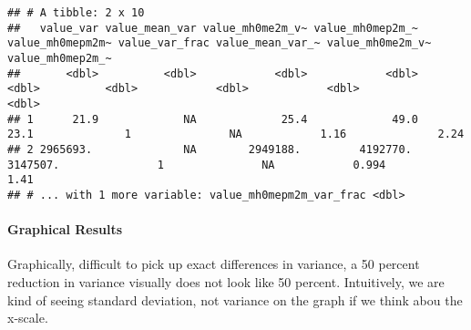 \documentclass[
]{book}
\newenvironment{Shaded}{\begin{snugshade}}{\end{snugshade}}
\newcommand{\DataTypeTok}[1]{\textcolor[rgb]{0.13,0.29,0.53}{#1}}
\newcommand{\DecValTok}[1]{\textcolor[rgb]{0.00,0.00,0.81}{#1}}
\newcommand{\KeywordTok}[1]{\textcolor[rgb]{0.13,0.29,0.53}{\textbf{#1}}}
\newcommand{\NormalTok}[1]{#1}
\newcommand{\OperatorTok}[1]{\textcolor[rgb]{0.81,0.36,0.00}{\textbf{#1}}}
\newcommand{\StringTok}[1]{\textcolor[rgb]{0.31,0.60,0.02}{#1}}
\begin{document}
\begin{Shaded}
\end{Shaded}

\begin{verbatim}
## # A tibble: 2 x 10
##   value_var value_mean_var value_mh0me2m_v~ value_mh0mep2m_~ value_mh0mepm2m~ value_var_frac value_mean_var_~ value_mh0me2m_v~ value_mh0mep2m_~
##       <dbl>          <dbl>            <dbl>            <dbl>            <dbl>          <dbl>            <dbl>            <dbl>            <dbl>
## 1      21.9             NA             25.4             49.0             23.1              1               NA            1.16              2.24
## 2 2965693.              NA        2949188.         4192770.         3147507.               1               NA            0.994             1.41
## # ... with 1 more variable: value_mh0mepm2m_var_frac <dbl>
\end{verbatim}

\hypertarget{graphical-results}{%
\paragraph{Graphical Results}\label{graphical-results}}

Graphically, difficult to pick up exact differences in variance, a 50 percent reduction in variance visually does not look like 50 percent. Intuitively, we are kind of seeing standard deviation, not variance on the graph if we think abou the x-scale.
\end{document}
